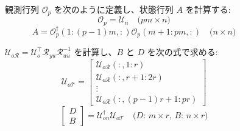 \begin{figure}[htbp]
\begin{algorithm}[H]
\begin{algorithmic}[1]
    \STATE 観測行列 $\mathcal{O}_p$ を次のように定義し、状態行列 $A$ を計算する:
    \[
    \mathcal{O}_p = \mathcal{U}_n \quad \text{($pm \times n$)}
    \]
    \[
    A = \mathcal{O}_p^\dagger(1:(p-1)m,:) \mathcal{O}_p(m+1:pm,:) \quad \text{($n \times n$)}
    \]
    
    \STATE $\mathcal{U}_{o\mathcal{R}} = \mathcal{U}_o^\top \mathcal{R}_{yu} \mathcal{R}_{uu}^{-1}$ を計算し、$B$ と $D$ を次の式で求める:
    \[
    \mathcal{U}_{o\mathcal{T}} = \begin{bmatrix} 
    \mathcal{U}_{o\mathcal{R}}(:,1:r) \\ 
    \mathcal{U}_{o\mathcal{R}}(:,r+1:2r) \\ 
    \vdots \\ 
    \mathcal{U}_{o\mathcal{R}}(:,(p-1)r+1:pr) 
    \end{bmatrix}
    \]
    \[
    \begin{bmatrix}
    D\\B
    \end{bmatrix}
    = \mathcal{U}_{on}^\dagger \mathcal{U}_{o\mathcal{T}} \quad \text{($D$: $m \times r$, $B$: $n \times r$)}
    \]
    
    \end{algorithmic}
    \end{algorithm}
\end{figure}
